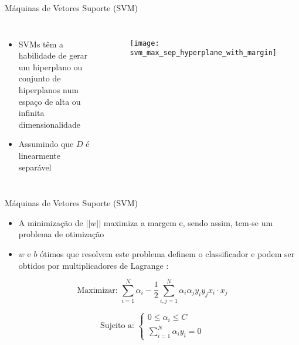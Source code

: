 \begin{frame}{Máquinas de Vetores Suporte (SVM)}
\begin{columns}
\begin{itemize}
    \item SVMs têm a habilidade de gerar um hiperplano ou conjunto de hiperplanos num espaço de alta ou infinita dimensionalidade \citep{duda:12}
    \item Assumindo que $D$ é linearmente separável \citep{lorena:03}
\end{itemize}

\begin{figure}[!h]
  \centering
  \texttt{[image: svm\_max\_sep\_hyperplane\_with\_margin]}
\end{figure}
\end{columns}

\end{frame}

\begin{frame}{Máquinas de Vetores Suporte (SVM)}
\begin{itemize}
    \item A minimização de $||w||$ maximiza a margem e, sendo assim, tem-se um problema de otimização
    \item $w$ e $b$ ótimos que resolvem este problema definem o classificador e podem ser obtidos por multiplicadores de Lagrange \citep{campbell:00}:
\end{itemize}
\begin{equation*}
\text{Maximizar: } \sum_{i=1}^N \alpha_i - \frac{1}{2} \sum_{i, j=1}^N \alpha_i \alpha_j y_i y_j x_i\cdot x_j
\end{equation*}

\begin{equation*}
\text{Sujeito a: }
\begin{cases}
    0 \leq \alpha_i \leq C\\[1em]
    \sum_{i=1}^N \alpha_i y_i = 0
\end{cases}
\end{equation*}

\end{frame}

